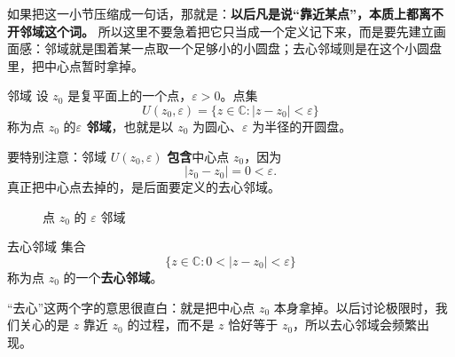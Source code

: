 如果把这一小节压缩成一句话，那就是：\textbf{以后凡是说``靠近某点''，本质上都离不开邻域这个词。} 所以这里不要急着把它只当成一个定义记下来，而是要先建立画面感：邻域就是围着某一点取一个足够小的小圆盘；去心邻域则是在这个小圆盘里，把中心点暂时拿掉。

\begin{dingliyi}{邻域}{}
设 $z_0$ 是复平面上的一个点，$\varepsilon>0$。点集
\begin{equation}
    U(z_0,\varepsilon)=\{z\in\mathbb{C}:|z-z_0|<\varepsilon\}
\end{equation}
称为点 $z_0$ 的\textbf{$\varepsilon$ 邻域}，也就是以 $z_0$ 为圆心、$\varepsilon$ 为半径的开圆盘。
\end{dingliyi}

\begin{zhu}{}{}
要特别注意：邻域 $U(z_0,\varepsilon)$ \textbf{包含}中心点 $z_0$，因为
\[
    |z_0-z_0|=0<\varepsilon.
\]
真正把中心点去掉的，是后面要定义的去心邻域。
\end{zhu}


\begin{figure}[htbp]
\centering
{}
\caption{点 $z_0$ 的 $\varepsilon$ 邻域}
\label{fig:ch02-neighborhood}
\end{figure}



\begin{dingliyi}{去心邻域}{}
	集合
	\begin{equation}
		\{z\in\mathbb{C}:0<|z-z_0|<\varepsilon\}
	\end{equation}
	称为点 $z_0$ 的一个\textbf{去心邻域}。
\end{dingliyi}

\begin{zhu}{}{}
	``去心''这两个字的意思很直白：就是把中心点 $z_0$ 本身拿掉。以后讨论极限时，我们关心的是 $z$ 靠近 $z_0$ 的过程，而不是 $z$ 恰好等于 $z_0$，所以去心邻域会频繁出现。
\end{zhu}

